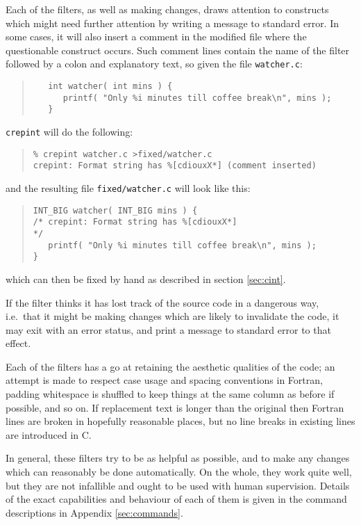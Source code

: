 \documentclass[twoside,11pt]{article}
\newcommand{\htmlref}[2]{#1}
\renewcommand{\_}{\texttt{\symbol{95}}}
\newcommand{\xroutine}[1]{\htmlref{{\tt #1}}{#1}}
\newcommand{\file}[1]{{\tt #1}}
\newenvironment{squote}{\begin{quote}\begin{small}}{\end{small}\end{quote}}
\begin{document}
Each of the filters, as well as making changes, 
draws attention to constructs which might need 
further attention by writing a message to standard error. 
In some cases, it will also insert a comment in the modified file where
the questionable construct occurs.
Such comment lines contain the name of the filter followed by a colon
and explanatory text, so given the file \file{watcher.c}:
\begin{squote}
\begin{verbatim}
   int watcher( int mins ) {
      printf( "Only %i minutes till coffee break\n", mins );
   }
\end{verbatim}
\end{squote}
\xroutine{crepint} will do the following:
\begin{squote}
\begin{verbatim}
% crepint watcher.c >fixed/watcher.c
crepint: Format string has %[cdiouxX*] (comment inserted)
\end{verbatim}
\end{squote}
and the resulting file \file{fixed/watcher.c} will look like this:
\begin{squote}
\begin{verbatim}
INT_BIG watcher( INT_BIG mins ) {
/* crepint: Format string has %[cdiouxX*]                                */
   printf( "Only %i minutes till coffee break\n", mins );
}
\end{verbatim}
\end{squote}
which can then be fixed by hand as described in
section \ref{sec:cint}.

If the filter thinks it has lost track of the source code in a dangerous
way, i.e.\ that it might be making changes which are likely to invalidate
the code, it may exit with an error status, and print a message to standard
error to that effect.

Each of the filters has a go at retaining the aesthetic 
qualities of the code; an attempt is made to respect 
case usage and spacing conventions in Fortran, 
padding whitespace is shuffled to keep things at the same column as
before if possible, and so on.
If replacement text is longer than the original
then Fortran lines are broken in hopefully reasonable places,
but no line breaks in existing lines are introduced in C.

In general, these filters try to be as helpful as possible, 
and to make any changes which can reasonably be done automatically.
On the whole, they work quite well, but they are not infallible
and ought to be used with human supervision.
Details of the exact capabilities and behaviour of each of them is
given in the command descriptions in Appendix \ref{sec:commands}.
\end{document}
